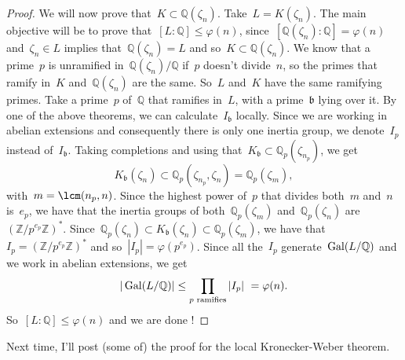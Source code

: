 \begin{theorem}
\begin{proof}
    We will now prove that~$K \subset \mathbb{Q}(\zeta_n)$. Take~$L = K(\zeta_n)$. The main objective will be to prove that~$\left[L:\mathbb{Q}\right] \leq \varphi(n)$, since $\left[\mathbb{Q}(\zeta_n):\mathbb{Q}\right] = \varphi(n)$ and~$\zeta_n \in L$ implies that~$\mathbb{Q}(\zeta_n) = L$ and so~$K \subset \mathbb{Q}(\zeta_n)$.
    We know that a prime~$p$ is unramified in~$\mathbb{Q}(\zeta_n)/\mathbb{Q}$ if~$p$ doesn't divide~$n$, so the primes that ramify in~$K$ and~$\mathbb{Q}(\zeta_n)$ are the same. So~$L$ and~$K$ have the same ramifying primes. Take a prime~$p$ of~$\mathbb{Q}$ that ramifies in~$L$, with a prime~$\mathfrak{b}$ lying over it. By one of the above theorems, we can calculate~$I_{\mathfrak{b}}$ locally. Since we are working in abelian extensions and consequently there is only one inertia group, we denote~$I_p$ instead of~$I_{\mathfrak{b}}$. Taking completions and using that~$K_\mathfrak{b} \subset \mathbb{Q}_p(\zeta_{n_p})$, we get
    \begin{equation}
      K_\mathfrak{b}(\zeta_n) \subset \mathbb{Q}_p(\zeta_{n_p},\zeta_n) = \mathbb{Q}_p(\zeta_m), 
    \end{equation}
    with~$m = \lcm(n_p,n)$. Since the highest power of~$p$ that divides both~$m$ and~$n$ is~$e_p$, we have that the inertia groups of both~$\mathbb{Q}_p(\zeta_m)$ and~$\mathbb{Q}_p(\zeta_n)$ are $(\mathbb{Z}/p^{e_p}\mathbb{Z})^*$. Since~$\mathbb{Q}_p(\zeta_n) \subset K_\mathfrak{b}(\zeta_n) \subset \mathbb{Q}_p(\zeta_m)$, we have that~$I_p = (\mathbb{Z}/p^{e_p}\mathbb{Z})^*$ and so~$|I_p| = \varphi(p^{e_p})$. Since all the~$I_p$ generate~$\operatorname{Gal}(L/\mathbb{Q})$ and we work in abelian extensions, we get
    \begin{equation}
      |\Gal(L/\mathbb{Q})|\leq \prod_{p \text{ ramifies}} |I_p|  = \varphi(n). 
    \end{equation}
    So~$\left[L:\mathbb{Q}\right] \leq \varphi(n)$ and we are done !
  \end{proof}
\end{theorem}

Next time, I'll post (some of) the proof for the local Kronecker-Weber theorem.
